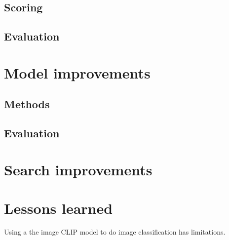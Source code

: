 \documentclass[article, 10pt]{article}
\begin{document}
\subsection{Scoring}
\subsection{Evaluation}


\section{Model improvements}
\subsection{Methods}
\subsection{Evaluation}


\section{Search improvements}

\section{Lessons learned} 
Using a the image CLIP model to do image classification has limitations. 
\end{document}
